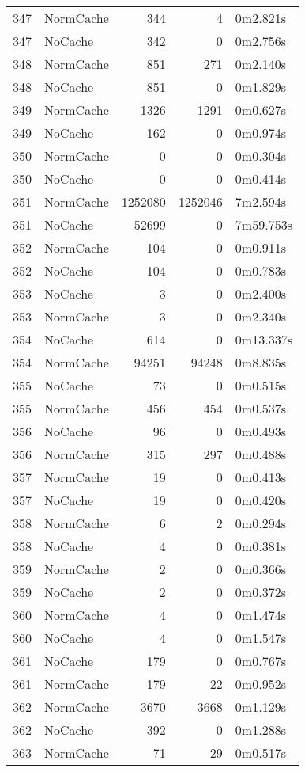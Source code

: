\begin{tabular}{llrrl}
347 & NormCache & 344 & 4 & 0m2.821s \\
347 & NoCache & 342 & 0 & 0m2.756s \\
348 & NormCache & 851 & 271 & 0m2.140s \\
348 & NoCache & 851 & 0 & 0m1.829s \\
349 & NormCache & 1326 & 1291 & 0m0.627s \\
349 & NoCache & 162 & 0 & 0m0.974s \\
350 & NormCache & 0 & 0 & 0m0.304s \\
350 & NoCache & 0 & 0 & 0m0.414s \\
351 & NormCache & 1252080 & 1252046 & 7m2.594s \\
351 & NoCache & 52699 & 0 & 7m59.753s \\
352 & NormCache & 104 & 0 & 0m0.911s \\
352 & NoCache & 104 & 0 & 0m0.783s \\
353 & NoCache & 3 & 0 & 0m2.400s \\
353 & NormCache & 3 & 0 & 0m2.340s \\
354 & NoCache & 614 & 0 & 0m13.337s \\
354 & NormCache & 94251 & 94248 & 0m8.835s \\
355 & NoCache & 73 & 0 & 0m0.515s \\
355 & NormCache & 456 & 454 & 0m0.537s \\
356 & NoCache & 96 & 0 & 0m0.493s \\
356 & NormCache & 315 & 297 & 0m0.488s \\
357 & NormCache & 19 & 0 & 0m0.413s \\
357 & NoCache & 19 & 0 & 0m0.420s \\
358 & NormCache & 6 & 2 & 0m0.294s \\
358 & NoCache & 4 & 0 & 0m0.381s \\
359 & NormCache & 2 & 0 & 0m0.366s \\
359 & NoCache & 2 & 0 & 0m0.372s \\
360 & NormCache & 4 & 0 & 0m1.474s \\
360 & NoCache & 4 & 0 & 0m1.547s \\
361 & NoCache & 179 & 0 & 0m0.767s \\
361 & NormCache & 179 & 22 & 0m0.952s \\
362 & NormCache & 3670 & 3668 & 0m1.129s \\
362 & NoCache & 392 & 0 & 0m1.288s \\
363 & NormCache & 71 & 29 & 0m0.517s \\

\end{tabular}
